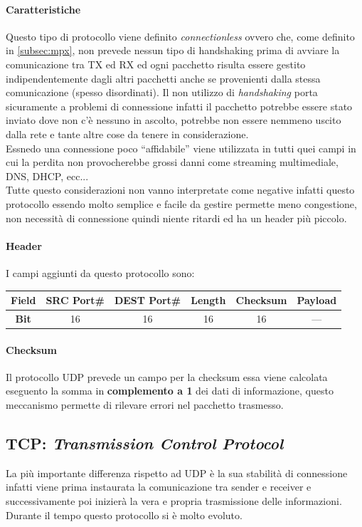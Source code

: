 \documentclass[12pt]{article}
\begin{document}
\paragraph{Caratteristiche} Questo tipo di protocollo viene definito \textit{connectionless} ovvero che, come definito in \ref{subsec:mpx}, non prevede nessun tipo di handshaking prima di avviare la comunicazione tra TX ed RX ed ogni pacchetto risulta essere gestito indipendentemente dagli altri pacchetti anche se provenienti dalla stessa comunicazione (spesso disordinati). Il non utilizzo di \textit{handshaking} porta sicuramente a problemi di connessione infatti il pacchetto potrebbe essere stato inviato dove non c'è nessuno in ascolto, potrebbe non essere nemmeno uscito dalla rete e tante altre cose da tenere in considerazione.\\
Essnedo una connessione poco ``affidabile'' viene utilizzata in tutti quei campi in cui la perdita non provocherebbe grossi danni come streaming multimediale, DNS, DHCP, ecc...\\
Tutte questo considerazioni non vanno interpretate come negative infatti questo protocollo essendo molto semplice e facile da gestire permette meno congestione, non necessità di connessione quindi niente ritardi ed ha un header più piccolo.

\paragraph{Header} I campi aggiunti da questo protocollo sono:
\begin{center}
\begin{tabular}{ |c||c|c|c|c|c| }
 \hline
 \textbf{Field} & SRC Port\# & DEST Port\# & Length & Checksum & Payload \\
 \hline
 \hline
 \textbf{Bit} & 16 & 16 & 16 & 16 & --- \\
 \hline
\end{tabular}
\end{center}

\paragraph{Checksum} Il protocollo UDP prevede un campo per la checksum essa viene calcolata eseguento la somma in \textbf{complemento a 1} dei dati di informazione, questo meccanismo permette di rilevare errori nel pacchetto trasmesso.

\subsection{TCP: \textit{Transmission Control Protocol}} %
La più importante differenza rispetto ad UDP è la sua stabilità di connessione infatti viene prima instaurata la comunicazione tra sender e receiver e successivamente poi inizierà la vera e propria trasmissione delle informazioni. Durante il tempo questo protocollo si è molto evoluto.
\end{document}
